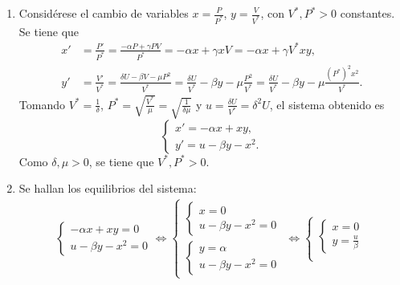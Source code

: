\documentclass[11pt]{report}
\begin{document}
\begin{solution}
    \hfill
    \begin{enumerate}
        \item Considérese el cambio de variables $x = \frac{P}{P^*}$, $y = \frac{V}{V^*}$, con $V^*,P^*>0$ constantes. Se tiene que
        \begin{align*}
            x' &= \frac{P'}{P^*} = \frac{-\alpha P + \gamma PV}{P^*} = -\alpha x+\gamma xV = -\alpha x+\gamma V^*xy, \\
            y' &= \frac{V'}{V^*} = \frac{\delta U -\beta V-\mu P^2}{V^*} = \frac{\delta U}{V^*} -\beta y -\mu\frac{P^2}{V^*} = \frac{\delta U}{V^*}-\beta y -\mu \frac{{(P^*)}^2x^2}{V^*}.
        \end{align*}
        Tomando $V^* = \frac{1}{\delta}$, $P^* = \sqrt{\frac{V^*}{\mu}} = \sqrt{\frac{1}{\delta\mu}}$ y $u = \frac{\delta U}{V^*} = \delta^2U$, el sistema obtenido es
        \[\begin{cases}
            x' = -\alpha x + xy, \\
            y' = u-\beta y -x^2.
        \end{cases}\]
        Como $\delta,\mu>0$, se tiene que $V^*,P^*>0$.
        \item Se hallan los equilibrios del sistema:
        \begin{align*}
            \begin{cases}
                -\alpha x + xy = 0 \\
                u-\beta y - x^2 = 0
            \end{cases} \iff \begin{cases}
                \begin{cases}
                x = 0 \\
                u-\beta y - x^2 = 0
                \end{cases} \\[20pt]
                \begin{cases}
                y = \alpha \\
                u-\beta y -x^2 = 0
                \end{cases}
            \end{cases}
            \iff 
            \begin{cases}
                \begin{cases}
                x = 0 \\
                y = \frac{u}{\beta}
                \end{cases} \\[20pt]

\end{cases}
\end{align*}
\end{enumerate}
\end{solution}
\end{document}
